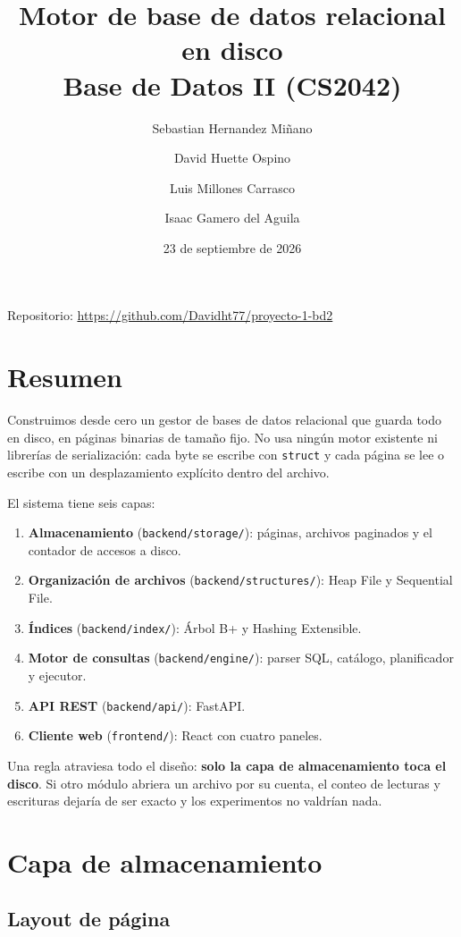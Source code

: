 \documentclass[11pt,a4paper]{article}
\title{Motor de base de datos relacional en disco\\
\large Base de Datos II (CS2042)}
\author{Sebastian Hernandez Miñano \and David Huette Ospino \and
Luis Millones Carrasco \and Isaac Gamero del Aguila}
\date{23 de septiembre de 2026}
\newcommand{\code}[1]{\texttt{#1}}
\begin{document}
\maketitle

\begin{center}
Repositorio: \url{https://github.com/Davidht77/proyecto-1-bd2}
\end{center}

\section{Resumen}

Construimos desde cero un gestor de bases de datos relacional que guarda todo en
disco, en páginas binarias de tamaño fijo. No usa ningún motor existente ni
librerías de serialización: cada byte se escribe con \code{struct} y cada página se
lee o escribe con un desplazamiento explícito dentro del archivo.

El sistema tiene seis capas:

\begin{enumerate}
  \item \textbf{Almacenamiento} (\code{backend/storage/}): páginas, archivos
        paginados y el contador de accesos a disco.
  \item \textbf{Organización de archivos} (\code{backend/structures/}): Heap File y
        Sequential File.
  \item \textbf{Índices} (\code{backend/index/}): Árbol B+ y Hashing Extensible.
  \item \textbf{Motor de consultas} (\code{backend/engine/}): parser SQL, catálogo,
        planificador y ejecutor.
  \item \textbf{API REST} (\code{backend/api/}): FastAPI.
  \item \textbf{Cliente web} (\code{frontend/}): React con cuatro paneles.
\end{enumerate}

Una regla atraviesa todo el diseño: \textbf{solo la capa de almacenamiento toca el
disco}. Si otro módulo abriera un archivo por su cuenta, el conteo de lecturas y
escrituras dejaría de ser exacto y los experimentos no valdrían nada.

\section{Capa de almacenamiento}

\subsection{Layout de página}
\end{document}

